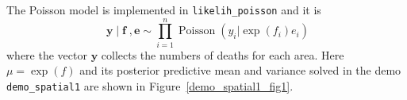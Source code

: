 \documentclass[twoside,11pt]{article}
\DeclareMathOperator{\f}{\mathbf{f}}
\DeclareMathOperator{\y}{\mathbf{y}}
\DeclareMathOperator{\Poisson}{Poisson}
\newcommand{\mb}{\mathbf}
\newcommand{\code}[1]{{\normalfont\texttt{#1}}}
\begin{document}
The Poisson model is implemented in \code{likelih\_poisson} and
it is
%
\begin{equation}
 \y|\f,\mb{e}  \sim \prod_{i=1}^{n} \Poisson(y_i|\exp(f_i)e_i) \label{Poisson_likelihood}
\end{equation}
%
where the vector $\mb{y}$ collects the numbers of deaths for each
area. Here $\mu=\exp(f)$ and its posterior predictive mean and
variance solved in the demo \code{demo\_spatial1} are shown in
Figure~\ref{demo_spatial1_fig1}.
\end{document}
